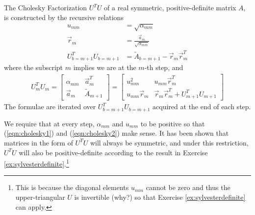 \begin{defn}
The Cholesky Factorization $U^TU$ of a real symmetric, positive-definite matrix $A$, is constructed by the recursive relations
\begin{subequations}
\begin{align}
u_{mm} &= \sqrt{\alpha_{mm}} \label{eqn:cholesky1} \\
\vec{r}_m &= \frac{\vec{a}_m}{\sqrt{\alpha_{mm}}} \label{eqn:cholesky2} \\
U_{b=m+1}^T U_{b=m+1} &= \tilde{A}_{b=m+1} - \vec{r}_m\vec{r}_m^T 
\end{align}    
\end{subequations}
where the subscript $m$ implies we are at the $m$-th step, and
\begin{align}
U_m^T U_m = 
\begin{bmatrix}
\alpha_{mm} & \vec{a}_{m}^T \\
\vec{a}_m & \tilde{A}_{m+1} 
\end{bmatrix}
=
\begin{bmatrix}
u_{mm}^2 & u_{mm}\vec{r}_m^T \\
u_{mm}\vec{r}_m & \vec{r}_m\vec{r}_m^T + U_{m+1}^T U_{m+1}
\end{bmatrix} 
\end{align}
The formulae are iterated over $U_{b=m+1}^T U_{b=m+1}$ acquired at the end of each step.
\end{defn}
We require that at every step, $\alpha_{mm}$ and $u_{mm}$ to be positive so that (\ref{eqn:cholesky1}) and (\ref{eqn:cholesky2}) make sense. It has been shown that matrices in the form of $U^T U$ will always be symmetric, and under this restriction, $U^T U$ will also be positive-definite according to the result in Exercise \ref{ex:sylvesterdefinite}.\footnote{This is because the diagonal elements $u_{mm}$ cannot be zero and thus the upper-triangular $U$ is invertible (why?) so that Exercise \ref{ex:sylvesterdefinite} can apply.} 

